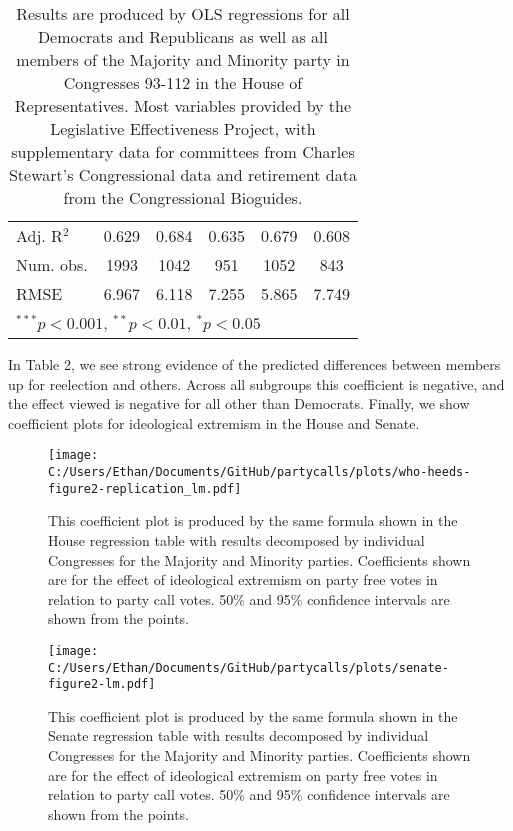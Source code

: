 \documentclass[12pt]{article}
\newcommand\fnote[1]{\captionsetup{font=small}\caption*{#1}}
\begin{document}
\begin{table}[H]
\begin{center}
\begin{tabular}{l c c c c c }
			Adj. R$^2$             & 0.629          & 0.684         & 0.635          & 0.679          & 0.608         \\
			Num. obs.              & 1993           & 1042          & 951            & 1052           & 843           \\
			RMSE                   & 6.967          & 6.118         & 7.255          & 5.865          & 7.749         \\
			\hline
			\multicolumn{6}{l}{\scriptsize{$^{***}p<0.001$, $^{**}p<0.01$, $^*p<0.05$}}
		\end{tabular}
	\fnote{Results are produced by OLS regressions for all Democrats and Republicans as well as all members of the Majority and Minority party in Congresses 93-112 in the House of Representatives. Most variables provided by the Legislative Effectiveness Project, with supplementary data for committees from Charles Stewart's Congressional data and retirement data from the Congressional Bioguides.}
	\end{center}
\end{table}

In Table 2, we see strong evidence of the predicted differences between members up for reelection and others. Across all subgroups this coefficient is negative, and the effect viewed is negative for all other than Democrats. Finally, we show coefficient plots for ideological extremism in the House and Senate. 

\begin{figure}[H]
	\centering
	\caption{House Ideological Extremism Coefficient Plot}
	\texttt{[image: C:/Users/Ethan/Documents/GitHub/partycalls/plots/who-heeds-figure2-replication\_lm.pdf]}
	\fnote{This coefficient plot is produced by the same formula shown in the House regression table with results decomposed by individual Congresses for the Majority and Minority parties. Coefficients shown are for the effect of ideological extremism on party free votes in relation to party call votes. 50\% and 95\% confidence intervals are shown from the points.}
\end{figure}

\begin{figure}[H]
	\centering
	\caption{Senate Ideological Extremism Coefficient Plot}
	\texttt{[image: C:/Users/Ethan/Documents/GitHub/partycalls/plots/senate-figure2-lm.pdf]}
	\fnote{This coefficient plot is produced by the same formula shown in the Senate regression table with results decomposed by individual Congresses for the Majority and Minority parties. Coefficients shown are for the effect of ideological extremism on party free votes in relation to party call votes. 50\% and 95\% confidence intervals are shown from the points.}
\end{figure}
\end{document}
